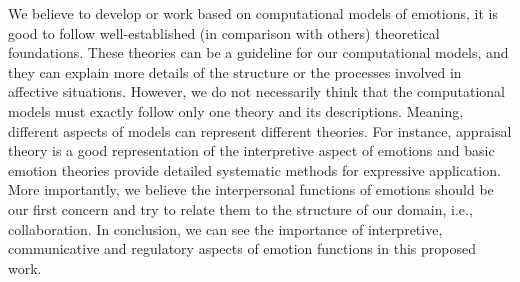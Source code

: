 \documentclass[11pt]{article}
\begin{document}
We believe to develop or work based on computational models of emotions, it is
good to follow well-established (in comparison with others) theoretical
foundations. These theories can be a guideline for our computational models, and
they can explain more details of the structure or the processes involved in
affective situations. However, we do not necessarily think that the
computational models must exactly follow only one theory and its descriptions.
Meaning, different aspects of models can represent different theories. For
instance, appraisal theory is a good representation of the interpretive aspect
of emotions and basic emotion theories provide detailed systematic methods for
expressive application. More importantly, we believe the interpersonal functions
of emotions should be our first concern and try to relate them to the structure
of our domain, i.e., collaboration. In conclusion, we can see the importance of
interpretive, communicative and regulatory aspects of emotion functions in this
proposed work.



\end{document}
